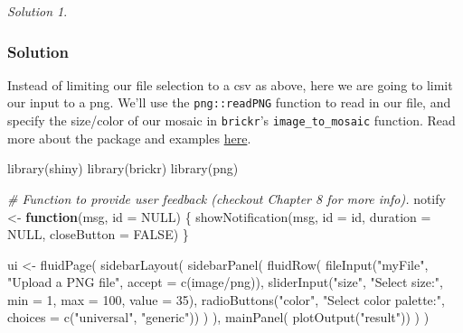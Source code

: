 \documentclass[
]{book}
\newenvironment{Shaded}{\begin{snugshade}}{\end{snugshade}}
\newcommand{\AttributeTok}[1]{\textcolor[rgb]{0.77,0.63,0.00}{#1}}
\newcommand{\CommentTok}[1]{\textcolor[rgb]{0.56,0.35,0.01}{\textit{#1}}}
\newcommand{\ConstantTok}[1]{\textcolor[rgb]{0.00,0.00,0.00}{#1}}
\newcommand{\ControlFlowTok}[1]{\textcolor[rgb]{0.13,0.29,0.53}{\textbf{#1}}}
\newcommand{\DecValTok}[1]{\textcolor[rgb]{0.00,0.00,0.81}{#1}}
\newcommand{\FunctionTok}[1]{\textcolor[rgb]{0.00,0.00,0.00}{#1}}
\newcommand{\NormalTok}[1]{#1}
\newcommand{\OtherTok}[1]{\textcolor[rgb]{0.56,0.35,0.01}{#1}}
\newcommand{\StringTok}[1]{\textcolor[rgb]{0.31,0.60,0.02}{#1}}
\theoremstyle{definition}
\theoremstyle{definition}
\theoremstyle{definition}
\theoremstyle{definition}
\theoremstyle{remark}
\newtheorem*{solution}{Solution}
\begin{document}
\begin{solution}
\leavevmode

\hypertarget{solution-28}{%
\subsubsection*{Solution}\label{solution-28}}

Instead of limiting our file selection to a csv as above, here we are going to
limit our input to a png. We'll use the \texttt{png::readPNG} function to read in our
file, and specify the size/color of our mosaic in \texttt{brickr}'s \texttt{image\_to\_mosaic}
function. Read more about the package and examples
\href{https://github.com/ryantimpe/brickr}{here}.

\begin{Shaded}
\begin{Highlighting}[]
\FunctionTok{library}\NormalTok{(shiny)}
\FunctionTok{library}\NormalTok{(brickr)}
\FunctionTok{library}\NormalTok{(png)}

\CommentTok{\# Function to provide user feedback (checkout Chapter 8 for more info).}
\NormalTok{notify }\OtherTok{\textless{}{-}} \ControlFlowTok{function}\NormalTok{(msg, }\AttributeTok{id =} \ConstantTok{NULL}\NormalTok{) \{}
  \FunctionTok{showNotification}\NormalTok{(msg, }\AttributeTok{id =}\NormalTok{ id, }\AttributeTok{duration =} \ConstantTok{NULL}\NormalTok{, }\AttributeTok{closeButton =} \ConstantTok{FALSE}\NormalTok{)}
\NormalTok{\}}

\NormalTok{ui }\OtherTok{\textless{}{-}} \FunctionTok{fluidPage}\NormalTok{(}
  \FunctionTok{sidebarLayout}\NormalTok{(}
    \FunctionTok{sidebarPanel}\NormalTok{(}
      \FunctionTok{fluidRow}\NormalTok{(}
        \FunctionTok{fileInput}\NormalTok{(}\StringTok{"myFile"}\NormalTok{, }\StringTok{"Upload a PNG file"}\NormalTok{, }\AttributeTok{accept =} \FunctionTok{c}\NormalTok{(}\StringTok{\textquotesingle{}image/png\textquotesingle{}}\NormalTok{)),}
        \FunctionTok{sliderInput}\NormalTok{(}\StringTok{"size"}\NormalTok{, }\StringTok{"Select size:"}\NormalTok{, }\AttributeTok{min =} \DecValTok{1}\NormalTok{, }\AttributeTok{max =} \DecValTok{100}\NormalTok{, }\AttributeTok{value =} \DecValTok{35}\NormalTok{),}
        \FunctionTok{radioButtons}\NormalTok{(}\StringTok{"color"}\NormalTok{, }\StringTok{"Select color palette:"}\NormalTok{, }\AttributeTok{choices =} \FunctionTok{c}\NormalTok{(}\StringTok{"universal"}\NormalTok{, }\StringTok{"generic"}\NormalTok{))}
\NormalTok{      )}
\NormalTok{    ),}
    \FunctionTok{mainPanel}\NormalTok{(}
      \FunctionTok{plotOutput}\NormalTok{(}\StringTok{"result"}\NormalTok{))}
\NormalTok{  )}
\NormalTok{)}


\end{Highlighting}
\end{Shaded}
\end{solution}
\end{document}
